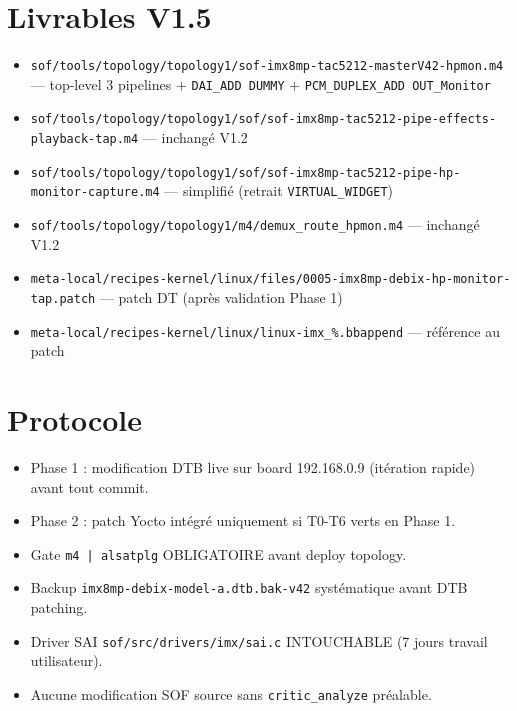 \documentclass[11pt,a4paper]{article}
\begin{document}
\section{Livrables V1.5}

\begin{itemize}[leftmargin=*, itemsep=1pt]
  \item \texttt{sof/tools/topology/topology1/sof-imx8mp-tac5212-masterV42-hpmon.m4} — top-level 3 pipelines + \texttt{DAI\_ADD DUMMY} + \texttt{PCM\_DUPLEX\_ADD OUT\_Monitor}
  \item \texttt{sof/tools/topology/topology1/sof/sof-imx8mp-tac5212-pipe-effects-playback-tap.m4} — inchangé V1.2
  \item \texttt{sof/tools/topology/topology1/sof/sof-imx8mp-tac5212-pipe-hp-monitor-capture.m4} — simplifié (retrait \texttt{VIRTUAL\_WIDGET})
  \item \texttt{sof/tools/topology/topology1/m4/demux\_route\_hpmon.m4} — inchangé V1.2
  \item \texttt{meta-local/recipes-kernel/linux/files/0005-imx8mp-debix-hp-monitor-tap.patch} — patch DT (après validation Phase 1)
  \item \texttt{meta-local/recipes-kernel/linux/linux-imx\_\%.bbappend} — référence au patch
\end{itemize}

\section{Protocole}

\begin{itemize}[leftmargin=*, itemsep=1pt]
  \item Phase 1 : modification DTB live sur board 192.168.0.9 (itération rapide) avant tout commit.
  \item Phase 2 : patch Yocto intégré uniquement si T0-T6 verts en Phase 1.
  \item Gate \texttt{m4 | alsatplg} OBLIGATOIRE avant deploy topology.
  \item Backup \texttt{imx8mp-debix-model-a.dtb.bak-v42} systématique avant DTB patching.
  \item Driver SAI \texttt{sof/src/drivers/imx/sai.c} INTOUCHABLE (7 jours travail utilisateur).
  \item Aucune modification SOF source sans \texttt{critic\_analyze} préalable.
\end{itemize}
\end{document}
